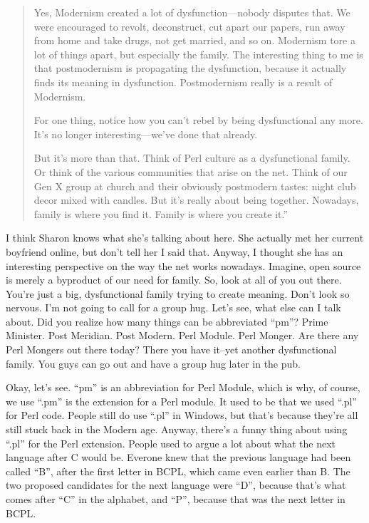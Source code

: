 \documentclass[10pt,letterpaper]{article}
\newcommand{\acro}[1]{{\small\MakeUppercase #1\spacefactor1000}}
\begin{document}
\begin{quotation}
\noindent{}Yes, Modernism created a lot of
dysfunction---nobody disputes that. We were encouraged to revolt, deconstruct,
cut apart our papers, run away from home and take drugs, not get married, and
so on. Modernism tore a lot of things apart, but especially the family. The
interesting thing to me is that postmodernism is propagating the dysfunction,
because it actually finds its meaning in dysfunction. Postmodernism really is
a result of Modernism.

For one thing, notice how you can't rebel by being dysfunctional any more.
It's no longer interesting---we've done that already.

But it's more than that. Think of Perl culture as a dysfunctional family. Or
think of the various communities that arise on the net. Think of our Gen X
group at church and their obviously postmodern tastes: night club decor mixed
with candles. But it's really about being together. Nowadays, family is where
you find it. Family is where you create it.''
\end{quotation}

\noindent I think Sharon knows what she's talking about here. She actually met her
current boyfriend online, but don't tell her I said that. Anyway, I thought
she has an interesting perspective on the way the net works nowadays.
Imagine, open source is merely a byproduct of our need for family. So, look
at all of you out there. You're just a big, dysfunctional family trying to
create meaning. Don't look so nervous. I'm not going to call for a group hug.
Let's see, what else can I talk about. Did you realize how many things can be
abbreviated ``pm''? Prime Minister. Post Meridian. Post Modern. Perl
Module. Perl Monger. Are there any Perl Mongers out there today? There you
have it--yet another dysfunctional family. You guys can go out and have a
group hug later in the pub.

Okay, let's see. ``pm'' is an abbreviation for Perl Module, which is why,
of course, we use ``.pm'' is the extension for a Perl module. It used to be
that we used ``.pl'' for Perl code. People still do use ``.pl'' in
Windows, but that's because they're all still stuck back in the Modern age.
Anyway, there's a funny thing about using ``.pl'' for the Perl extension.
People used to argue a lot about what the next language after C would be.
Everone knew that the previous language had been called ``B'', after the
first letter in \acro{BCPL}, which came even earlier than B. The two proposed
candidates for the next language were ``D'', because that's what comes
after ``C'' in the alphabet, and ``P'', because that was the next letter
in \acro{BCPL}.
\end{document}
